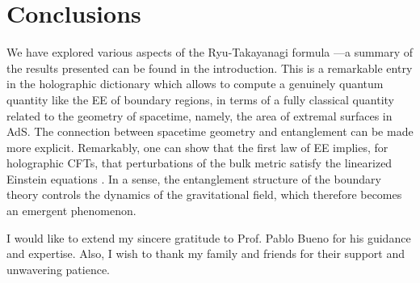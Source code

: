 \documentclass[twocolumn]{revtex4}
\begin{document}
\section{Conclusions} \label{s:Conclusions}
We have explored various aspects of the Ryu-Takayanagi formula ---a summary of the results presented can be found in the introduction. This is a remarkable entry in the holographic dictionary which allows to compute a genuinely quantum quantity like the EE of boundary regions, in terms of a fully classical quantity related to the geometry of spacetime, namely, the area of extremal surfaces in AdS. The connection between spacetime geometry and entanglement can be made more explicit. Remarkably, one can show that the first law of EE implies, for holographic CFTs, that perturbations of the bulk metric satisfy the linearized Einstein equations \cite{faulkner_gravitation_2014}. In a sense, the entanglement structure of the boundary theory controls the dynamics of the gravitational field, which therefore becomes an emergent phenomenon.  



\begin{acknowledgments}

    I would like to extend my sincere gratitude to Prof. Pablo Bueno for his guidance and expertise. Also, I wish to thank my family and friends for their support and unwavering patience.
    
\end{acknowledgments}




% 
\end{document}
